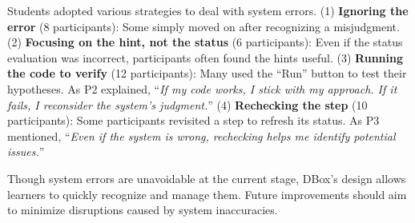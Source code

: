 Students adopted various strategies to deal with system errors. (1) \textbf{Ignoring the error} (8 participants): Some simply moved on after recognizing a misjudgment. (2) \textbf{Focusing on the hint, not the status} (6 participants): Even if the status evaluation was incorrect, participants often found the hints useful.  (3) \textbf{Running the code to verify} (12 participants): Many used the ``Run'' button to test their hypotheses. As P2 explained, ``\emph{If my code works, I stick with my approach. If it fails, I reconsider the system's judgment.}'' (4) \textbf{Rechecking the step} (10 participants): Some participants revisited a step to refresh its status. As P3 mentioned, ``\emph{Even if the system is wrong, rechecking helps me identify potential issues.}''

Though system errors are unavoidable at the current stage, DBox’s design allows learners to quickly recognize and manage them. Future improvements should aim to minimize disruptions caused by system inaccuracies.





